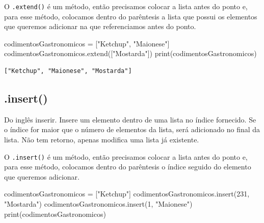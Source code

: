 \documentclass[
  letterpaper,
  DIV=11,
  numbers=noendperiod]{scrreprt}
\newenvironment{Shaded}{\begin{snugshade}}{\end{snugshade}}
\newcommand{\BuiltInTok}[1]{\textcolor[rgb]{0.00,0.23,0.31}{#1}}
\newcommand{\DecValTok}[1]{\textcolor[rgb]{0.68,0.00,0.00}{#1}}
\newcommand{\NormalTok}[1]{\textcolor[rgb]{0.00,0.23,0.31}{#1}}
\newcommand{\OperatorTok}[1]{\textcolor[rgb]{0.37,0.37,0.37}{#1}}
\newcommand{\StringTok}[1]{\textcolor[rgb]{0.13,0.47,0.30}{#1}}
\begin{document}
O \texttt{.extend()} é um método, então precisamos colocar a lista antes
do ponto e, para esse método, colocamos dentro do parêntesis a lista que
possui os elementos que queremos adicionar na que referenciamos antes do
ponto.

\begin{Shaded}
\begin{Highlighting}[]
\NormalTok{codimentosGastronomicos }\OperatorTok{=}\NormalTok{ [}\StringTok{"Ketchup"}\NormalTok{, }\StringTok{"Maionese"}\NormalTok{]}
\NormalTok{codimentosGastronomicos.extend([}\StringTok{"Mostarda"}\NormalTok{])}
\BuiltInTok{print}\NormalTok{(codimentosGastronomicos)}
\end{Highlighting}
\end{Shaded}

\begin{tcolorbox}[enhanced jigsaw, breakable, leftrule=.75mm, left=2mm, opacityback=0, bottomrule=.15mm, toprule=.15mm, rightrule=.15mm, arc=.35mm, colback=white]

\begin{verbatim}
["Ketchup", "Maionese", "Mostarda"]
\end{verbatim}

\end{tcolorbox}

\hypertarget{insert}{%
\subsection{.insert()}\label{insert}}

Do inglês inserir. Insere um elemento dentro de uma lista no índice
fornecido. Se o índice for maior que o número de elementos da lista,
será adicionado no final da lista. Não tem retorno, apenas modifica uma
lista já existente.

O \texttt{.insert()} é um método, então precisamos colocar a lista antes
do ponto e, para esse método, colocamos dentro do parêntesis o índice
seguido do elemento que queremos adicionar.

\begin{Shaded}
\begin{Highlighting}[]
\NormalTok{codimentosGastronomicos }\OperatorTok{=}\NormalTok{ [}\StringTok{"Ketchup"}\NormalTok{]}
\NormalTok{codimentosGastronomicos.insert(}\DecValTok{231}\NormalTok{, }\StringTok{"Mostarda"}\NormalTok{)}
\NormalTok{codimentosGastronomicos.insert(}\DecValTok{1}\NormalTok{, }\StringTok{"Maionese"}\NormalTok{)}
\BuiltInTok{print}\NormalTok{(codimentosGastronomicos)}
\end{Highlighting}
\end{Shaded}
\end{document}
